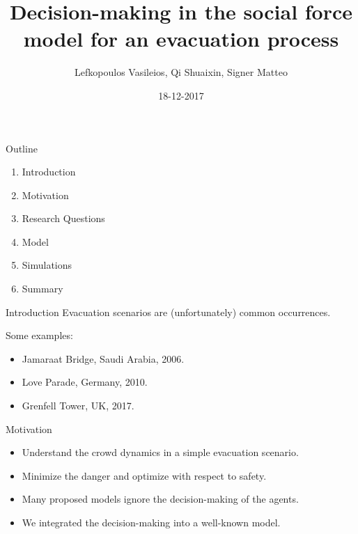 \documentclass[aspectratio=43]{beamer}
\author[LQS]{Lefkopoulos Vasileios, Qi Shuaixin, Signer Matteo}
\title{Decision-making in the social force model for an evacuation process}
\date{18-12-2017}
\begin{document}
\titleframe


\begin{frame}{Outline}
	\begin{enumerate}
		\item Introduction
		\smallskip
		\item Motivation
		\smallskip
		\item Research Questions
		\smallskip
		\item Model
		\smallskip
		\item Simulations
		\smallskip
		\item Summary
	\end{enumerate}
\end{frame}


\begin{frame}{Introduction}
	Evacuation scenarios are (unfortunately) common occurrences.
	
	\quad
	
	Some examples:
	\begin{itemize}
		\item Jamaraat Bridge, Saudi Arabia, 2006. \\
		\item Love Parade, Germany, 2010. \\
		\item Grenfell Tower, UK, 2017. \\
	\end{itemize}
\end{frame}


\begin{frame}{Motivation}
	\begin{itemize}
		\item Understand the crowd dynamics in a simple evacuation scenario. \\
		\bigskip
		\item Minimize the danger and optimize with respect to safety. \\
		\bigskip
		\item Many proposed models ignore the decision-making of the agents. \\
		\bigskip
		\item We integrated the decision-making into a well-known model.
	\end{itemize}
\end{frame}
\end{document}
